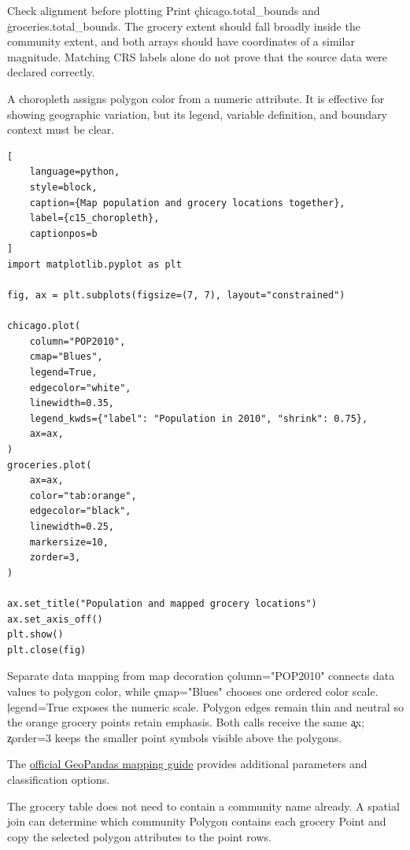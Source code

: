 \begin{TryBox}{Check alignment before plotting}
Print \c{chicago.total_bounds} and \c{groceries.total_bounds}. The grocery
extent should fall broadly inside the community extent, and both arrays should
have coordinates of a similar magnitude. Matching CRS labels alone do not
prove that the source data were declared correctly.
\end{TryBox}


A choropleth assigns polygon color from a numeric attribute. It is effective
for showing geographic variation, but its legend, variable definition, and
boundary context must be clear.

\begin{lstlisting}[
    language=python,
    style=block,
    caption={Map population and grocery locations together},
    label={c15_choropleth},
    captionpos=b
]
import matplotlib.pyplot as plt

fig, ax = plt.subplots(figsize=(7, 7), layout="constrained")

chicago.plot(
    column="POP2010",
    cmap="Blues",
    legend=True,
    edgecolor="white",
    linewidth=0.35,
    legend_kwds={"label": "Population in 2010", "shrink": 0.75},
    ax=ax,
)
groceries.plot(
    ax=ax,
    color="tab:orange",
    edgecolor="black",
    linewidth=0.25,
    markersize=10,
    zorder=3,
)

ax.set_title("Population and mapped grocery locations")
ax.set_axis_off()
plt.show()
plt.close(fig)
\end{lstlisting}

\begin{SyntaxBox}{Separate data mapping from map decoration}
\c{column="POP2010"} connects data values to polygon color, while
\c{cmap="Blues"} chooses one ordered color scale. \c{legend=True} exposes the
numeric scale. Polygon edges remain thin and neutral so the orange grocery
points retain emphasis. Both calls receive the same \c{ax}; \c{zorder=3} keeps
the smaller point symbols visible above the polygons.
\end{SyntaxBox}

The
\href{https://geopandas.org/en/stable/docs/user_guide/mapping.html}{official GeoPandas mapping guide}
provides additional parameters and classification options.


The grocery table does not need to contain a community name already. A spatial
join can determine which community Polygon contains each grocery Point and
copy the selected polygon attributes to the point rows.

